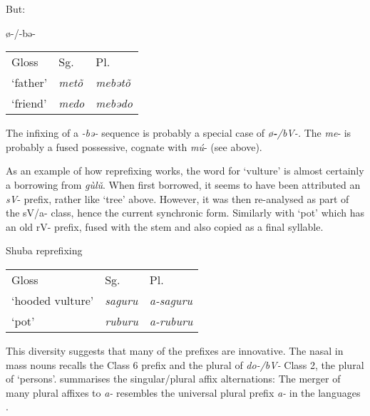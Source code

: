 \documentclass[output=paper]{langsci/langscibook}
\begin{document}
But:
\begin{exe}
\exi{}
\begin{xlist}
\setcounter{xnumii}{8}
\ex ø-/-bə-

\begin{tabularx}{.8\textwidth}{XXX}
{Gloss}	& {Sg.}	& {Pl.}\\
‘father’	&  \textit{metõ}	&  \textit{mebətõ}\\
‘friend’	&  \textit{medo}	&  \textit{mebədo}\\
\end{tabularx}
\end{xlist}
\end{exe}

The infixing of a \textit{-bə-} sequence is probably a special case of \textit{ø}\textbf{\textit{-}}\textit{/bV-.} The \textit{me}- is probably a fused possessive, cognate with  \textit{mú}- (see above).

  
As an example of how reprefixing works, the word for ‘vulture’ is almost certainly a borrowing from  \textit{gùlǔ}. When first borrowed, it seems to have been attributed an \textit{sV}- prefix, rather like ‘tree’ above. However, it was then re-analysed as part of the sV/a- class, hence the current synchronic form. Similarly with ‘pot’ which has an old rV- prefix, fused with the stem and also copied as a final syllable.

\ea
{Shuba reprefixing}\\
\begin{tabularx}{.8\textwidth}{XXX}
{Gloss}	& {Sg.}	& {Pl.}\\
‘hooded  vulture’	&  \textit{saguru}	&  \textit{a-saguru}\\
‘pot’	&  \textit{ruburu}	&  \textit{a-ruburu}\\
\end{tabularx}
\z

This diversity suggests that many of the prefixes are innovative. The nasal in mass nouns recalls the Class 6 prefix and the plural of \textit{do-/bV-} Class 2, the plural of ‘persons’.  summarises the  singular/plural affix alternations: The merger of many plural affixes to \textit{a-} resembles the universal plural prefix \textit{a-} in the  languages \citep{HymanMagaji1970}.


\renewcommand{\tikzmark}[2]{\tikz[overlay,remember picture] \node (#1) {#2};}
\renewcommand{\connect}[3][]{%
  \tikz[overlay,remember picture]{%
    \draw[-,thick,#1] (#2) -- (#3) node   {};  %
  }
} 
\end{document}
